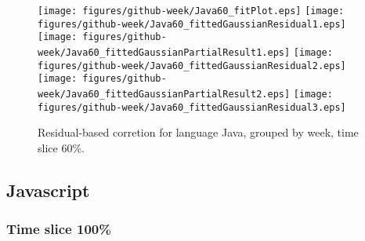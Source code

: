 \begin{figure}[hb]
\centering
{}
{\texttt{[image: figures/github-week/Java60\_fitPlot.eps]}}
{\texttt{[image: figures/github-week/Java60\_fittedGaussianResidual1.eps]}}
{\texttt{[image: figures/github-week/Java60\_fittedGaussianPartialResult1.eps]}}
{\texttt{[image: figures/github-week/Java60\_fittedGaussianResidual2.eps]}}
{\texttt{[image: figures/github-week/Java60\_fittedGaussianPartialResult2.eps]}}
{\texttt{[image: figures/github-week/Java60\_fittedGaussianResidual3.eps]}}
\caption{Residual-based corretion for language Java, grouped by week, time slice 60\%.}
\end{figure}


\clearpage 
\newpage 


\subsection{Javascript}

\FloatBarrier

\subsubsection{Time slice 100\%}

